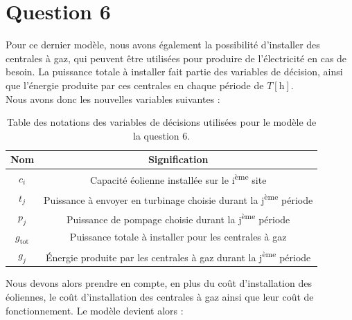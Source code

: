 \documentclass{article}
\newcommand{\unit}[1]{[\mathrm{#1}]}
\begin{document}
\clearpage

\section*{Question 6}
Pour ce dernier modèle, nous avons également la possibilité d'installer des centrales à gaz, qui peuvent être utilisées pour produire de l'électricité en cas de besoin.
La puissance totale à installer fait partie des variables de décision, ainsi que l'énergie produite par ces centrales en chaque période de $T \unit{h}$.\\
Nous avons donc les nouvelles variables suivantes :

\begin{table}[h!]
    \centering
    \renewcommand{\arraystretch}{1.5}%
    \begin{tabular}{|c || c |} 
        \hline
        Nom & Signification\\
        \hline\hline
        $c_i$ & Capacité éolienne installée sur le i\textsuperscript{ème} site\\
        $t_j$ & Puissance à envoyer en turbinage choisie durant la j\textsuperscript{ème} période\\
        $p_j$ & Puissance de pompage choisie durant la j\textsuperscript{ème} période\\
        $g_\mathrm{tot}$ & Puissance totale à installer pour les centrales à gaz\\
        $g_j$ & \'Energie produite par les centrales à gaz durant la j\textsuperscript{ème} période\\
        \hline
    \end{tabular}
    \caption{Table des notations des variables de décisions utilisées pour le modèle de la question 6.} 
    \label{table:notations_variables_6}
\end{table}

\noindent Nous devons alors prendre en compte, en plus du coût d'installation des éoliennes, le coût d'installation des centrales à gaz ainsi que leur coût de fonctionnement.
Le modèle devient alors :
\end{document}
